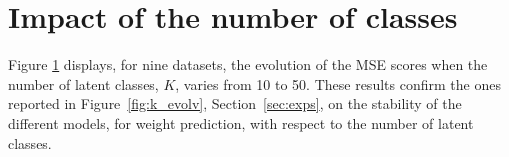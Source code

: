 \section{Impact of the number of classes}
\label{app:K}

\begin{figure}[ht]
\centering
	
   \label{fig:k_evolv-app}
\end{figure}

Figure \ref{fig:k_evolv-app} displays, for nine datasets, the evolution of the MSE scores when the number of latent classes, $K$, varies from 10 to 50. These results confirm the ones reported in Figure~\ref{fig:k_evolv}, Section~\ref{sec:exps}, on the stability of the different models, for weight prediction, with respect to the number of latent classes.
%
%
%
